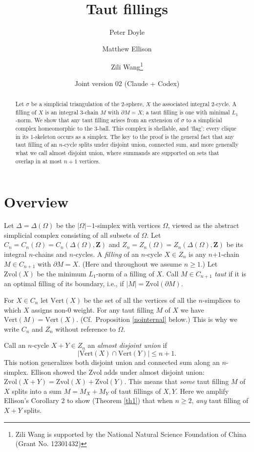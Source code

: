 \documentclass[12pt]{article}
\title{Taut fillings}
\author{Peter Doyle \and Matthew Ellison \and Zili Wang\thanks{
Zili Wang is supported by
the National Natural Science Foundation of China (Grant No. 12301432)
}}
\date{Joint version 02 (Claude + Codex)}
\def\ZZ{\mathbf{Z}}
\def\del{\partial}
\newcommand{\kw}{\mathrm}
\newcommand{\vertices}{\kw{Vert}}
\newcommand{\Zvol}{\kw{Zvol}}
\newcommand{\pls}{\mathord{+}}
\newcommand{\mns}{\mathord{-}}
\begin{document}
\maketitle

\begin{abstract}
Let $\sigma$ be a simplicial triangulation of the 2-sphere,
$X$ the associated integral 2-cycle.
A filling of $X$ is an integral 3-chain $M$
with $\del M = X$;
a taut filling is one with minimal $L_1$-norm.
We show that any taut filling 
arises from an extension of $\sigma$ to
a simplicial complex homeomorphic to the 3-ball.
This complex is shellable, and `flag':
every clique in its 1-skeleton occurs as a simplex.
The key to the proof is the general
fact that any taut filling of an $n$-cycle
splits under disjoint union, connected sum, and more generally
what we call almost disjoint union,
where summands are supported on sets that overlap in at most $n+1$ vertices.
\end{abstract}

\section{Overview}
Let $\Delta = \Delta(\Omega)$ be the $|\Omega|\mns 1$-simplex
with vertices $\Omega$,
viewed as the abstract simplicial complex consisting of all subsets of
$\Omega$.
Let $C_n=C_n(\Omega)=C_n(\Delta(\Omega),\ZZ)$
and $Z_n=Z_n(\Omega)=Z_n(\Delta(\Omega),\ZZ)$
be its integral $n$-chains and $n$-cycles.
A \emph{filling} of an $n$-cycle $X \in Z_n$ is any
$n\pls 1$-chain $M \in C_{n+1}$ with $\del M = X$.
(Here and throughout we assume $n\geq 1$.)
Let $\Zvol(X)$ be the minimum $L_1$-norm of a filling of $X$.
Call $M \in C_{n+1}$ \emph{taut} if it is an optimal filling
of its boundary, i.e., if $|M|=\Zvol(\del M)$.

For $X \in C_n$ let
$\vertices(X)$ be the set of all the vertices of all the $n$-simplices
to which $X$ assigns non-$0$ weight.
For any taut filling $M$ of $X$ we have $\vertices(M) = \vertices(X)$.
(Cf.\ Proposition \ref{nointernal} below.)
This is why we write $C_n$ and $Z_n$ without reference to $\Omega$.

Call an $n$-cycle $X+Y \in Z_n$ an \emph{almost disjoint union} if
\[
|\vertices(X) \cap \vertices(Y)| \leq n+1
.
\]
This notion generalizes both disjoint union and connected sum
along an $n$-simplex.
Ellison \cite{ellison:gap}
showed the $\Zvol$ adds under almost disjoint union:
$\Zvol(X+Y) = \Zvol(X) + \Zvol(Y)$.
This means that \emph{some} taut filling $M$ of $X$ splits into a sum
$M=M_X+M_Y$ of taut fillings of $X,Y$.
Here we amplify Ellison's Corollary 2 to show (Theorem \ref{th1})
that when $n \geq 2$, \emph{any} taut filling of $X+Y$ splits.
\end{document}
